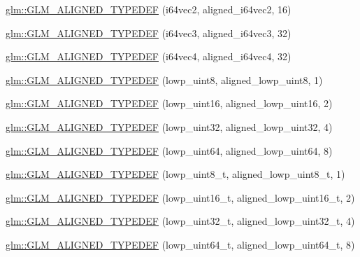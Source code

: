 \begin{DoxyCompactItemize}
\item 
\hyperlink{group__gtx__type__aligned_ga1f9e9c2ea2768675dff9bae5cde2d829}{glm\-::\-G\-L\-M\-\_\-\-A\-L\-I\-G\-N\-E\-D\-\_\-\-T\-Y\-P\-E\-D\-E\-F} (i64vec2, aligned\-\_\-i64vec2, 16)
\item 
\hyperlink{group__gtx__type__aligned_gad77c317b7d942322cd5be4c8127b3187}{glm\-::\-G\-L\-M\-\_\-\-A\-L\-I\-G\-N\-E\-D\-\_\-\-T\-Y\-P\-E\-D\-E\-F} (i64vec3, aligned\-\_\-i64vec3, 32)
\item 
\hyperlink{group__gtx__type__aligned_ga716f8ea809bdb11b5b542d8b71aeb04f}{glm\-::\-G\-L\-M\-\_\-\-A\-L\-I\-G\-N\-E\-D\-\_\-\-T\-Y\-P\-E\-D\-E\-F} (i64vec4, aligned\-\_\-i64vec4, 32)
\item 
\hyperlink{group__gtx__type__aligned_gad46f8e9082d5878b1bc04f9c1471cdaa}{glm\-::\-G\-L\-M\-\_\-\-A\-L\-I\-G\-N\-E\-D\-\_\-\-T\-Y\-P\-E\-D\-E\-F} (lowp\-\_\-uint8, aligned\-\_\-lowp\-\_\-uint8, 1)
\item 
\hyperlink{group__gtx__type__aligned_ga1246094581af624aca6c7499aaabf801}{glm\-::\-G\-L\-M\-\_\-\-A\-L\-I\-G\-N\-E\-D\-\_\-\-T\-Y\-P\-E\-D\-E\-F} (lowp\-\_\-uint16, aligned\-\_\-lowp\-\_\-uint16, 2)
\item 
\hyperlink{group__gtx__type__aligned_ga7a5009a1d0196bbf21dd7518f61f0249}{glm\-::\-G\-L\-M\-\_\-\-A\-L\-I\-G\-N\-E\-D\-\_\-\-T\-Y\-P\-E\-D\-E\-F} (lowp\-\_\-uint32, aligned\-\_\-lowp\-\_\-uint32, 4)
\item 
\hyperlink{group__gtx__type__aligned_ga45213fd18b3bb1df391671afefe4d1e7}{glm\-::\-G\-L\-M\-\_\-\-A\-L\-I\-G\-N\-E\-D\-\_\-\-T\-Y\-P\-E\-D\-E\-F} (lowp\-\_\-uint64, aligned\-\_\-lowp\-\_\-uint64, 8)
\item 
\hyperlink{group__gtx__type__aligned_ga0ba26b4e3fd9ecbc25358efd68d8a4ca}{glm\-::\-G\-L\-M\-\_\-\-A\-L\-I\-G\-N\-E\-D\-\_\-\-T\-Y\-P\-E\-D\-E\-F} (lowp\-\_\-uint8\-\_\-t, aligned\-\_\-lowp\-\_\-uint8\-\_\-t, 1)
\item 
\hyperlink{group__gtx__type__aligned_gaf2b58f5fb6d4ec8ce7b76221d3af43e1}{glm\-::\-G\-L\-M\-\_\-\-A\-L\-I\-G\-N\-E\-D\-\_\-\-T\-Y\-P\-E\-D\-E\-F} (lowp\-\_\-uint16\-\_\-t, aligned\-\_\-lowp\-\_\-uint16\-\_\-t, 2)
\item 
\hyperlink{group__gtx__type__aligned_gadc246401847dcba155f0699425e49dcd}{glm\-::\-G\-L\-M\-\_\-\-A\-L\-I\-G\-N\-E\-D\-\_\-\-T\-Y\-P\-E\-D\-E\-F} (lowp\-\_\-uint32\-\_\-t, aligned\-\_\-lowp\-\_\-uint32\-\_\-t, 4)
\item 
\hyperlink{group__gtx__type__aligned_gaace64bddf51a9def01498da9a94fb01c}{glm\-::\-G\-L\-M\-\_\-\-A\-L\-I\-G\-N\-E\-D\-\_\-\-T\-Y\-P\-E\-D\-E\-F} (lowp\-\_\-uint64\-\_\-t, aligned\-\_\-lowp\-\_\-uint64\-\_\-t, 8)

\end{DoxyCompactItemize}
